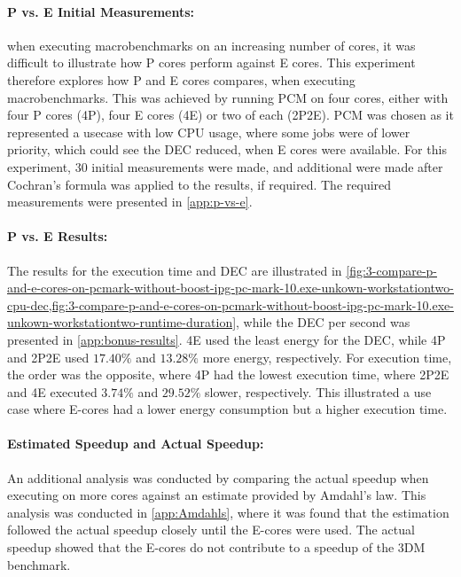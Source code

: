 

\paragraph{P vs. E Initial Measurements:} when executing macrobenchmarks on an increasing number of cores, it was difficult to illustrate how P cores perform against E cores. This experiment therefore explores how P and E cores compares, when executing macrobenchmarks. This was achieved by running PCM on four cores, either with four P cores (4P), four E cores (4E) or two of each (2P2E). PCM was chosen as it represented a usecase with low CPU usage, where some jobs were of lower priority, which could see the DEC reduced, when E cores were available. For this experiment, $30$ initial measurements were made, and additional were made after Cochran's formula was applied to the results, if required. The required measurements were presented in \cref{app:p-vs-e}.



\paragraph{P vs. E Results:} The results for the execution time and DEC are illustrated in \cref{fig:3-compare-p-and-e-cores-on-pcmark-without-boost-ipg-pc-mark-10.exe-unkown-workstationtwo-cpu-dec,fig:3-compare-p-and-e-cores-on-pcmark-without-boost-ipg-pc-mark-10.exe-unkown-workstationtwo-runtime-duration}, while the DEC per second was presented in \cref{app:bonus-results}. 4E used the least energy for the DEC, while 4P and 2P2E used $17.40\%$ and $13.28\%$ more energy, respectively. For execution time, the order was the opposite, where 4P had the lowest execution time, where 2P2E and 4E executed $3.74\%$ and $29.52\%$ slower, respectively. This illustrated a use case where E-cores had a lower energy consumption but a higher execution time.  


\paragraph{Estimated Speedup and Actual Speedup:}
An additional analysis was conducted by comparing the actual speedup when executing on more cores against an estimate provided by Amdahl's law. This analysis was conducted in \cref{app:Amdahls}, where it was found that the estimation followed the actual speedup closely until the E-cores were used. The actual speedup showed that the E-cores do not contribute to a speedup of the 3DM benchmark.


